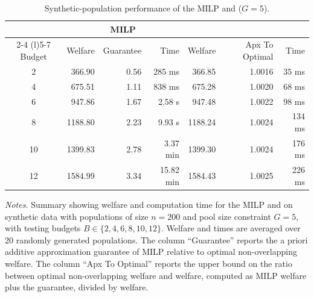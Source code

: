 \begin{table}[tb!]
    \centering
    \begin{threeparttable}
    \caption{Synthetic-population performance of the MILP and \greedy{} ($G=5$).}
    \label{table:experiment3}
    {\small
    \renewcommand{\arraystretch}{1.15}
    \begin{tabular}{@{} crrrrrr @{}}
        \toprule
        & \multicolumn{3}{c}{{MILP}} & \multicolumn{3}{c}{{\greedy{}}} \\
        \cmidrule(lr){2-4} \cmidrule(l){5-7}
        {Budget} & Welfare & Guarantee & Time & Welfare & Apx To Optimal & Time \\
        \midrule
        2 & 366.90 & 0.56 & 285 ms & 366.85 & 1.0016 & 35 ms \\
        4 & 675.51 & 1.11 & 838 ms & 675.28 & 1.0020 & 68 ms \\
        6 & 947.86 & 1.67 & 2.58 s & 947.48 & 1.0022 & 98 ms \\
        8 & 1188.80 & 2.23 & 9.93 s & 1188.24 & 1.0024 & 134 ms \\
        10 & 1399.83 & 2.78 & 3.37 min & 1399.30 & 1.0024 & 176 ms \\
        12 & 1584.99 & 3.34 & 15.82 min & 1584.43 & 1.0025 & 226 ms \\
        \bottomrule
    \end{tabular}
    }
    \begin{tablenotes}[flushleft]
    \footnotesize
    \item[] \emph{Notes.} Summary showing welfare and computation time for the MILP and \greedy{} on synthetic data with populations of size $n=200$ and pool size constraint $G=5$, with testing budgets $B \in \{2, 4, 6, 8, 10, 12\}$. Welfare and times are averaged over 20 randomly generated populations. The column ``Guarantee'' reports the a priori additive approximation guarantee of MILP relative to optimal non-overlapping welfare. The column ``Apx To Optimal'' reports the upper bound on the ratio between optimal non-overlapping welfare and \greedy{} welfare, computed as MILP welfare plus the guarantee, divided by \greedy{} welfare.
    \end{tablenotes}
    \end{threeparttable}
\end{table}
